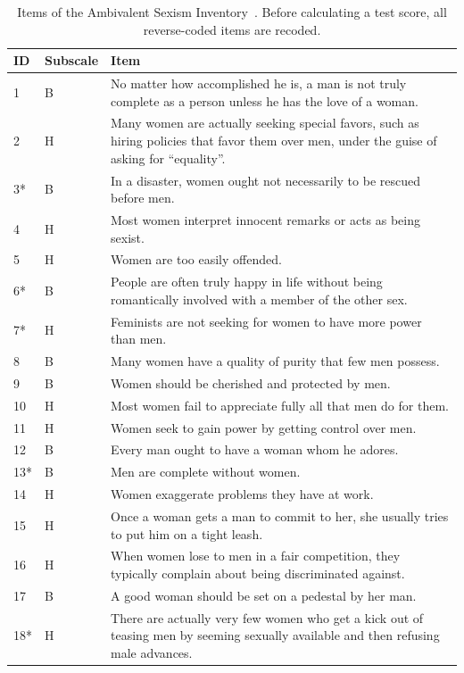 \documentclass{DESSThesis}
\begin{document}
\begin{table}
	\centering
	\caption{Items of the Ambivalent Sexism Inventory~\cite{glick_hostile_1997}. Before calculating a test score, all reverse-coded items are recoded.}
	\label{tab:ASI}
	\begin{threeparttable}
		\renewcommand*{\arraystretch}{1.3}
		\setlength{\tabcolsep}{0.3em}
		\begin{tabularx}{\textwidth}{llX}
			\toprule
			ID &  Subscale  & Item \\
			\midrule
			1&B&No matter how accomplished he is, a man is not truly complete as a person unless he has the love of a woman.\\
			2&H&Many women are actually seeking special favors, such as hiring policies that favor them over men, under the guise of asking for ``equality''.\\
			3*&B&In a disaster, women ought not necessarily to be rescued before men.\\
			4&H&Most women interpret innocent remarks or acts as being sexist.\\
			5&H&Women are too easily offended.\\
			6*&B&People are often truly happy in life without being romantically involved with a member of the other sex.\\
			7*&H&Feminists are not seeking for women to have more power than men.\\
			8&B&Many women have a quality of purity that few men possess.\\
			9&B&Women should be cherished and protected by men.\\
			10&H&Most women fail to appreciate fully all that men do for them.\\
			11&H&Women seek to gain power by getting control over men.\\
			12&B&Every man ought to have a woman whom he adores.\\
			13*&B&Men are complete without women.\\
			14&H&Women exaggerate problems they have at work.\\
			15&H&Once a woman gets a man to commit to her, she usually tries to put him on a tight leash.\\
			16&H&When women lose to men in a fair competition, they typically complain about being discriminated against.\\
			17&B&A good woman should be set on a pedestal by her man.\\
			18*&H&There are actually very few women who get a kick out of teasing men by seeming sexually available and then refusing male advances.\\

\end{tabularx}
\end{threeparttable}
\end{table}
\end{document}

